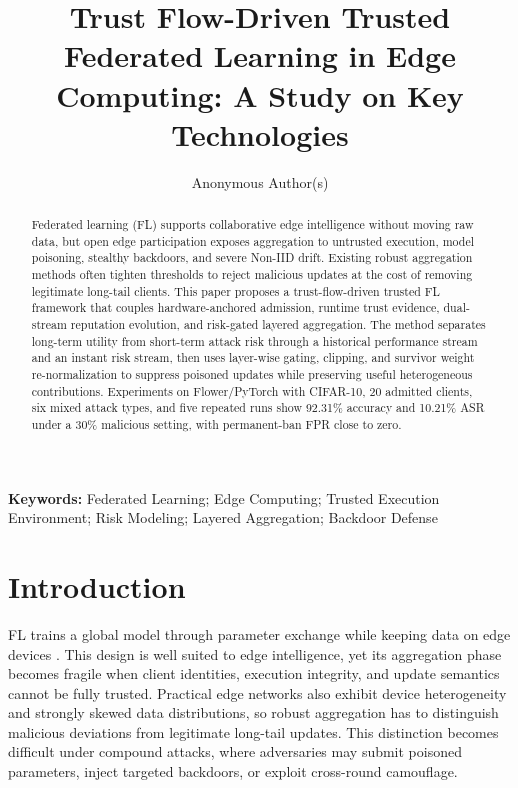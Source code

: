 \documentclass[runningheads,orivec]{llncs}
\begin{document}
\title{Trust Flow-Driven Trusted Federated Learning in Edge Computing: A Study on Key Technologies}

\author{Anonymous Author(s)}
\institute{}

\maketitle

\begin{abstract}
Federated learning (FL) supports collaborative edge intelligence without moving raw data, but open edge participation exposes aggregation to untrusted execution, model poisoning, stealthy backdoors, and severe Non-IID drift. Existing robust aggregation methods often tighten thresholds to reject malicious updates at the cost of removing legitimate long-tail clients. This paper proposes a trust-flow-driven trusted FL framework that couples hardware-anchored admission, runtime trust evidence, dual-stream reputation evolution, and risk-gated layered aggregation. The method separates long-term utility from short-term attack risk through a historical performance stream and an instant risk stream, then uses layer-wise gating, clipping, and survivor weight re-normalization to suppress poisoned updates while preserving useful heterogeneous contributions. Experiments on Flower/PyTorch with CIFAR-10, 20 admitted clients, six mixed attack types, and five repeated runs show 92.31\% accuracy and 10.21\% ASR under a 30\% malicious setting, with permanent-ban FPR close to zero.
\end{abstract}

\noindent\textbf{Keywords:} Federated Learning; Edge Computing; Trusted Execution Environment; Risk Modeling; Layered Aggregation; Backdoor Defense

\section{Introduction}

FL trains a global model through parameter exchange while keeping data on edge devices \cite{kairouz2021flsurvey,mcmahan2017fedavg}. This design is well suited to edge intelligence, yet its aggregation phase becomes fragile when client identities, execution integrity, and update semantics cannot be fully trusted. Practical edge networks also exhibit device heterogeneity and strongly skewed data distributions, so robust aggregation has to distinguish malicious deviations from legitimate long-tail updates. This distinction becomes difficult under compound attacks, where adversaries may submit poisoned parameters, inject targeted backdoors, or exploit cross-round camouflage.
\end{document}

